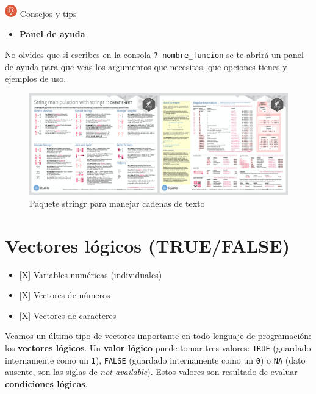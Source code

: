 \documentclass[11pt,]{book}
\providecommand{\tightlist}{%
  \setlength{\itemsep}{0pt}\setlength{\parskip}{0pt}}
\begin{document}
~

\includegraphics[width=0.04\textwidth,height=\textheight]{img/logo_info.png} Consejos y tips

\begin{itemize}
\tightlist
\item
  \textbf{Panel de ayuda}
\end{itemize}

No olvides que si escribes en la consola \texttt{?\ nombre\_funcion} se te abrirá un panel de ayuda para que veas los argumentos que necesitas, que opciones tienes y ejemplos de uso.

\begin{figure}
\includegraphics[width=17.08in]{./img/stringr} \caption{Paquete stringr para manejar cadenas de texto}\label{fig:stringr2}
\end{figure}

\hypertarget{vectores-luxf3gicos-truefalse}{%
\section{Vectores lógicos (TRUE/FALSE)}\label{vectores-luxf3gicos-truefalse}}

\begin{itemize}
\tightlist
\item
  {[}X{]} Variables numéricas (individuales)
\item
  {[}X{]} Vectores de números
\item
  {[}X{]} Vectores de caracteres
\end{itemize}

Veamos un último tipo de vectores importante en todo lenguaje de programación: los \textbf{vectores lógicos}. Un \textbf{valor lógico} puede tomar tres valores: \texttt{TRUE} (guardado internamente como un \texttt{1}), \texttt{FALSE} (guardado internamente como un \texttt{0}) o \texttt{NA} (dato ausente, son las siglas de \emph{not available}). Estos valores son resultado de evaluar \textbf{condiciones lógicas}.
\end{document}
